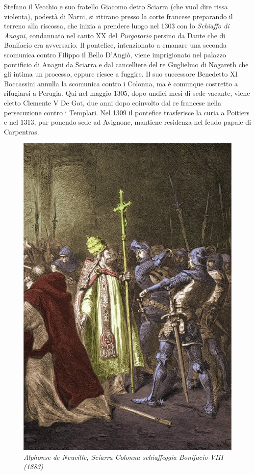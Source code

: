\documentclass[
  letterpaper,
  DIV=11,
  numbers=noendperiod]{scrartcl}
\begin{document}
Stefano il Vecchio e suo fratello Giacomo detto Sciarra (che vuol dire
rissa violenta), podestà di Narni, si ritirano presso la corte francese
preparando il terreno alla riscossa, che inizia a prendere luogo nel
1303 con lo \emph{Schiaffo di Anagni}, condannato nel canto XX del
\emph{Purgatorio} persino da
\href{2024-05-27-dante-islam-comandini.html}{Dante} che di Bonifacio era
avversario. Il pontefice, intenzionato a emanare una seconda scomunica
contro Filippo il Bello D'Angiò, viene imprigionato nel palazzo
pontificio di Anagni da Sciarra e dal cancelliere del re Guglielmo di
Nogareth che gli intima un processo, eppure riesce a fuggire. Il suo
successore Benedetto XI Boccassini annulla la scomunica contro i
Colonna, ma è comunque costretto a rifugiarsi a Perugia. Qui nel maggio
1305, dopo undici mesi di sede vacante, viene eletto Clemente V De Got,
due anni dopo coinvolto dal re francese nella persecuzione contro i
Templari. Nel 1309 il pontefice trasferisce la curia a Poitiers e nel
1313, pur ponendo sede ad Avignone, mantiene residenza nel feudo papale
di Carpentras.

\begin{figure}

{\centering \includegraphics{../../images/2024/san_rocco/4AlphonsedeNeuville-SchiaffodiAnagni1883.jpg}

}

\caption{\emph{Alphonse de Neuville, Sciarra Colonna schiaffeggia
Bonifacio VIII (1883)}}

\end{figure}
\end{document}
